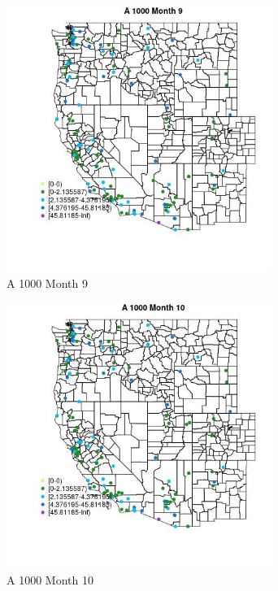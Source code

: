 \begin{figure} 
\centering  
\includegraphics[width=0.77\textwidth]{Code_Outputs/Report_ML_input_PM25_Step4_part_e_de_duplicated_aves_MapObsMo9A_1000.jpg} 
\caption{\label{fig:Report_ML_input_PM25_Step4_part_e_de_duplicated_avesMapObsMo9A_1000}A 1000 Month 9} 
\end{figure} 
 

\clearpage 

\begin{figure} 
\centering  
\includegraphics[width=0.77\textwidth]{Code_Outputs/Report_ML_input_PM25_Step4_part_e_de_duplicated_aves_MapObsMo10A_1000.jpg} 
\caption{\label{fig:Report_ML_input_PM25_Step4_part_e_de_duplicated_avesMapObsMo10A_1000}A 1000 Month 10} 
\end{figure} 
 

